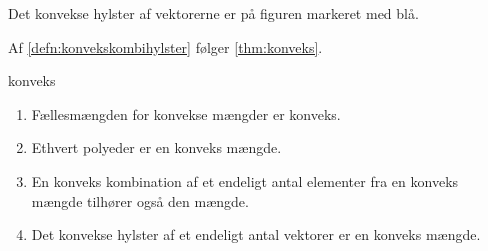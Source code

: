 Det konvekse hylster af vektorerne er på figuren markeret med blå.
%

%
Af \ref{defn:konvekskombihylster} følger \ref{thm:konveks}.
%
\begin{thm}{}{konveks}
\begin{enumerate}[label=(\alph*)]
	\item Fællesmængden for konvekse mængder er konveks. 
	\item Ethvert polyeder er en konveks mængde.
	\item En konveks kombination af et endeligt antal elementer fra en konveks mængde tilhører også den mængde. 
	\item Det konvekse hylster af et endeligt antal vektorer er en konveks mængde. 
\end{enumerate}
\end{thm}
%
%
\newpage
